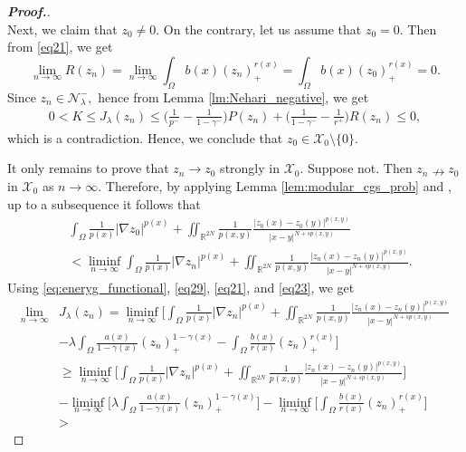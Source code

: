 \documentclass[11pt]{article}
\newcommand{\X}{\mathcal{X}_{0}}
\newcommand{\Nh}{\mathcal{N}_\la}
\newcommand{\lmt}{\lim_{n\to\infty}}
\newcommand{\ga} {\gamma}
\newcommand{\om} {\Omega}
\newcommand{\la} {\lambda}
\newcommand{\ra} {\rightarrow}
\newcommand{\grad}{\nabla}
\begin{document}
\begin{proof}[\bf Proof.]
$$$$
   Next, we claim that $z_0\neq0.$
On the contrary, let us assume that $z_0=0.$
Then from \eqref{eq21}, we get
    \begin{equation*}
\lmt R(z_n)=\lim_{n\to\infty}
\int_\om b(x)(z_n)_+^{r(x)}=
\int_\om b(x)(z_0)_+^{r(x)}=0.
  \end{equation*}
Since $z_n\in \Nh^-,$
hence from Lemma \ref{lm:Nehari_negative}, 
we get
\begin{align*}
        0<K\le J_\la(z_n)\le \Big (
\frac{1}{p^-}-
\frac{1}{1-\ga^-} \Big ) P(z_n)+\Big (
\frac{1}{1-\ga^-}-
\frac{1}{r^+} \Big ) R(z_n)\le0,
    \end{align*}
    which is a contradiction.
Hence, we conclude that 
$z_0\in\X\setminus\{0\}.$

     It only remains to prove that 
     $z_n\ra z_0$
strongly in $\X.$
Suppose not.
Then $z_n\nrightarrow z_0$
in $\X$
as $n\to\infty.$
Therefore, by applying 
Lemma \ref{lem:modular_cgs_prob} and
\cite[Lemma 2.4.17]{Variable_book}, 
up to a subsequence it follows that
        \begin{align}\label{eq23}
        &
\int_\om 
\frac{1}{p(x)}|\grad z_0|^{p(x)}
 +\iint_{\mathbb{R}^{2N}} 
\frac{1}{p(x,y)}
\frac{|z_0(x)-z_0(y)|^{p(x,y)}}
{|x-y|^{N+sp(x,y)}} \\ \nonumber 
        & <\liminf_{n\to\infty}
\int_\om 
\frac{1}{p(x)}|\grad z_n|^{p(x)}
+\iint_{\mathbb{R}^{2N}} 
\frac{1}{p(x,y)}
\frac{|z_n(x)-z_n(y)|^{p(x,y)}}
{|x-y|^{N+sp(x,y)}}.
    \end{align}
    Using \eqref{eq:eneryg_functional},
\eqref{eq29}, \eqref{eq21}, and \eqref{eq23},
 we get
    \begin{align}\label{eq24}
\lim_{n\to \infty} 
& J_\la(z_n)
=\liminf_{n\to \infty}
\Big [
\int_\om 
\frac{1}{p(x)}|\grad z_n|^{p(x)}
+\iint_{\mathbb{R}^{2N}} 
\frac{1}{p(x,y)}
\frac{|z_n(x)-z_n(y)|^{p(x,y)}}
{|x-y|^{N+sp(x,y)}}  \nonumber\\
        & -\la
\int_\om 
\frac{a(x)}{1-\ga(x)}(z_n)_+^{1-\ga(x)}
        -
\int_\om 
\frac{b(x)}{r(x)}(z_n)_+^{r(x)}\Big]
\nonumber\\
    &    \geq \liminf_{n\to \infty}
 \Big [
\int_\om 
\frac{1}{p(x)}|\grad z_n|^{p(x)}
+\iint_{\mathbb{R}^{2N}} 
\frac{1}{p(x,y)}
\frac{|z_n(x)-z_n(y)|^{p(x,y)}}
{|x-y|^{N+sp(x,y)}}\Big ]\nonumber\\
 & -\liminf_{n\to\infty}\Big [\la
\int_\om 
\frac{a(x)}{1-\ga(x)}(z_n)_+^{1-\ga(x)}
\Big ]-\liminf_{n\to\infty}\Big [
\int_\om 
\frac{b(x)}{r(x)}(z_n)_+^{r(x)}
\Big ]\nonumber\\
 &       >

\end{align}
\end{proof}
\end{document}

